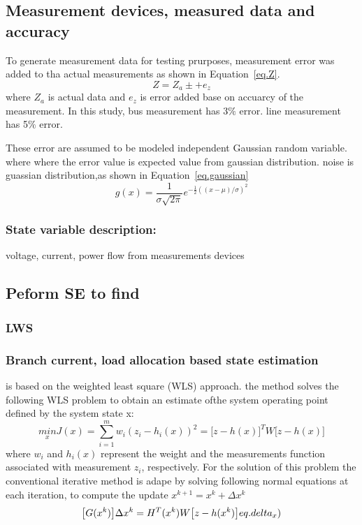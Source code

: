 \subsection{Measurement devices, measured data and accuracy}

To generate measurement data for testing prurposes, measurement error was added to tha actual measurements as shown in Equation~\ref{eq.Z}.
\begin{equation}
  Z=Z_{a} \pm +e_{z}
\label{eq.Z}
\end{equation}
where $Z_{a}$ is actual data and $e_{z}$ is error added base on accuarcy of the measurement.
In this study, bus measurement has 3$\%$ error. line measurement has 5$\%$ error.

These error are assumed to be modeled independent Gaussian random variable\cite{b2}.
where where the error value is expected value from gaussian distribution.
noise is guassian distribution,as shown in Equation~\ref{eq.gaussian}
\begin{equation}
  g(x)=\frac{1}{\sigma \sqrt{2\pi}}e^{-\frac{1}{2}((x-\mu)/\sigma)^2}
  \label{eq.gaussian}
\end{equation}
\subsubsection{State variable description:} voltage, current, power flow from measurements devices

\subsection{Peform SE to find }
\subsubsection{LWS}
\subsubsection{Branch current, load allocation based state estimation}
is based on the weighted least square (WLS) approach\cite{b1}.
the method solves the following WLS problem to obtain an estimate ofthe system operating point defined by the system state x:
\begin{equation}
  \underset{x}{min} J(x)=\sum_{i=1}^{m}w_{i}(z_{i}-h_{i}(x))^{2}=\big[ z-h(x)\big]^{T}W\big[z-h(x)\big]
\label{eq.jacobian}
\end{equation}
where $w_{i}$ and $h_{i}(x)$ represent the weight and the measurements function associated with measurement $z_{i}$, respectively.
For the solution of this problem the conventional iterative method is adape by solving following normal equations at each iteration, to compute the update $x^{k+1}=x^{k}+\Delta x^{k}$
\begin{equation}
  \big[G(x^{k})\big]\Delta x^{k} = H^{T}(x^{k})W \big[ z-h(x^{k}) \big]
  \label(eq.delta_x)
\end{equation}

